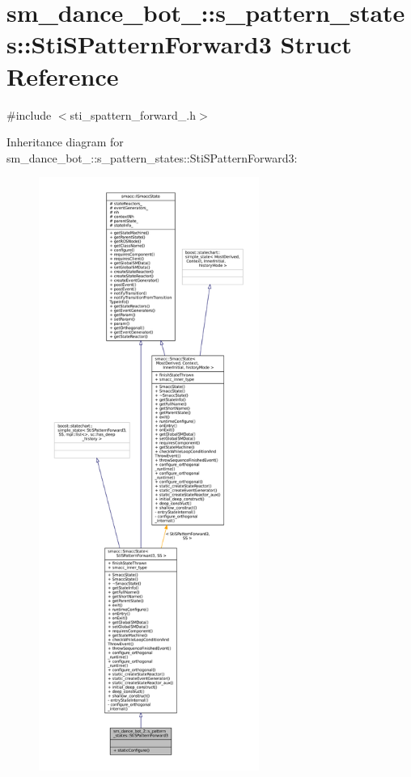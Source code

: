 \hypertarget{structsm__dance__bot__2_1_1s__pattern__states_1_1StiSPatternForward3}{}\section{sm\+\_\+dance\+\_\+bot\+\_\+:\+:s\+\_\+pattern\+\_\+states\+:\+:Sti\+S\+Pattern\+Forward3 Struct Reference}
\label{structsm__dance__bot__2_1_1s__pattern__states_1_1StiSPatternForward3}


{\ttfamily \#include $<$sti\+\_\+spattern\+\_\+forward\+\_.\+h$>$}



Inheritance diagram for sm\+\_\+dance\+\_\+bot\+\_\+:\+:s\+\_\+pattern\+\_\+states\+:\+:Sti\+S\+Pattern\+Forward3\+:
\nopagebreak
\begin{figure}[H]
\begin{center}
\leavevmode
\includegraphics[height=550pt]{structsm__dance__bot__2_1_1s__pattern__states_1_1StiSPatternForward3__inherit__graph}
\end{center}
\end{figure}


